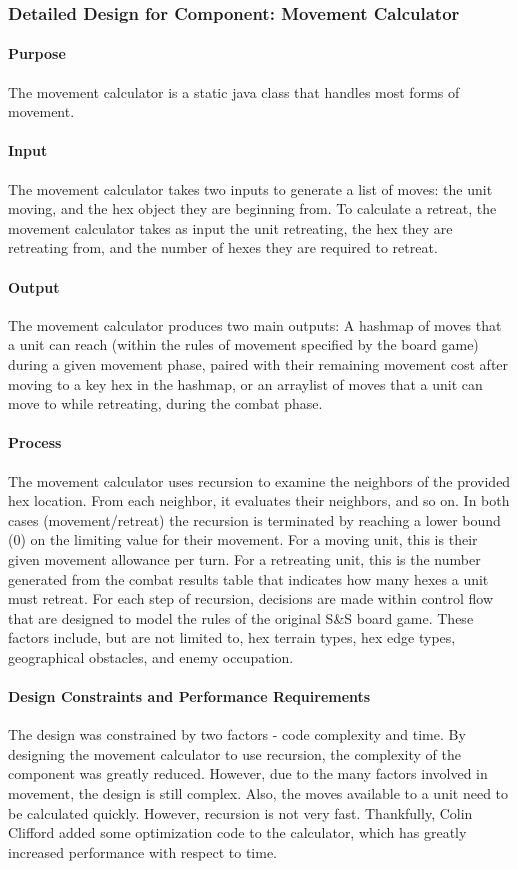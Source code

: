\documentclass[12pt,a4paper,titlepage]{article}
\begin{document}
\subsubsection{Detailed Design for Component: Movement Calculator}
\paragraph{Purpose} The movement calculator is a static java class that handles most forms of movement. 
\paragraph{Input} The movement calculator takes two inputs to generate a list of moves: the unit moving, and the hex object they are beginning from. To calculate a retreat, the movement calculator takes as input the unit retreating, the hex they are retreating from, and the number of hexes they are required to retreat.
\paragraph{Output} The movement calculator produces two main outputs: A hashmap of moves that a unit can reach (within the rules of movement specified by the board game) during a given movement phase, paired with their remaining movement cost after moving to a key hex in the hashmap, or an arraylist of moves that a unit can move to while retreating, during the combat phase.
\paragraph{Process} The movement calculator uses recursion to examine the neighbors of the provided hex location. From each neighbor, it evaluates their neighbors, and so on. In both cases (movement/retreat) the recursion is terminated by reaching a lower bound (0) on the limiting value for their movement. For a moving unit, this is their given movement allowance per turn. For a retreating unit, this is the number generated from the combat results table that indicates how many hexes a unit must retreat. For each step of recursion, decisions are made within control flow that are designed to model the rules of the original S\&S board game. These factors include, but are not limited to, hex terrain types, hex edge types, geographical obstacles, and enemy occupation. 
\paragraph{Design Constraints and Performance Requirements} The design was constrained by two factors - code complexity and time. By designing the movement calculator to use recursion, the complexity of the component was greatly reduced. However, due to the many factors involved in movement, the design is still complex. Also, the moves available to a unit need to be calculated quickly. However, recursion is not very fast. Thankfully, Colin Clifford added some optimization code to the calculator, which has greatly increased performance with respect to time.
\end{document}
